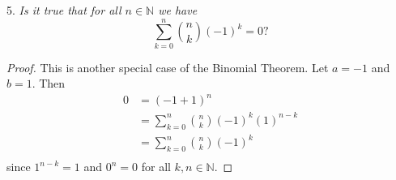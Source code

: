 \documentclass{article}
\begin{document}
\begin{flushleft}
5. \textsl{Is it true that for all $n \in \mathbb{N}$ we have
\[
\sum_{k=0}^n \binom{n}{k} \left( -1 \right)^k = 0?
\]}
\begin{proof}
This is another special case of the Binomial Theorem. Let $a=-1$ and $b=1$. Then
\begin{align*}
0 &= (-1+1)^n \\
  &= \sum_{k=0}^n \binom{n}{k} (-1)^k (1)^{n-k} \\
  &= \sum_{k=0}^n \binom{n}{k} (-1)^k \\
\end{align*}
since $1^{n-k} = 1$ and $0^n=0$ for all $k,n \in \mathbb{N}$.
\end{proof}







\end{flushleft}
\end{document}
